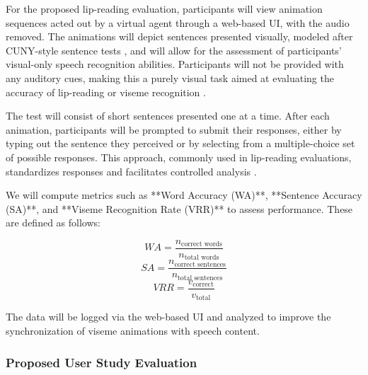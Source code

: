 \documentclass[12pt]{article}
\begin{document}
For the proposed lip-reading evaluation, participants will view animation sequences acted out by a virtual agent through a web-based UI, with the audio removed. The animations will depict sentences presented visually, modeled after CUNY-style sentence tests \cite{Altieri2011}, and will allow for the assessment of participants’ visual-only speech recognition abilities. Participants will not be provided with any auditory cues, making this a purely visual task aimed at evaluating the accuracy of lip-reading or viseme recognition \cite{Altieri2011}.

The test will consist of short sentences presented one at a time. After each animation, participants will be prompted to submit their responses, either by typing out the sentence they perceived or by selecting from a multiple-choice set of possible responses. This approach, commonly used in lip-reading evaluations, standardizes responses and facilitates controlled analysis \cite{Altieri2011}.

We will compute metrics such as **Word Accuracy (WA)**, **Sentence Accuracy (SA)**, and **Viseme Recognition Rate (VRR)** to assess performance. These are defined as follows:

\[
WA = \frac{n_{\text{correct words}}}{n_{\text{total words}}}
\]
\[
SA = \frac{n_{\text{correct sentences}}}{n_{\text{total sentences}}}
\]
\[
VRR = \frac{v_{\text{correct}}}{v_{\text{total}}}
\]

The data will be logged via the web-based UI and analyzed to improve the synchronization of viseme animations with speech content.

\subsubsection{Proposed User Study Evaluation}



\end{document}
